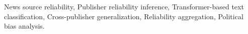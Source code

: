 \documentclass[journal]{IEEEtran}
\begin{document}
\begin{IEEEkeywords}
News source reliability, 
Publisher reliability inference, 
Transformer-based text classification, 
Cross-publisher generalization, 
Reliability aggregation, 
Political bias analysis.
\end{IEEEkeywords}

\IEEEpeerreviewmaketitle







\end{document}
